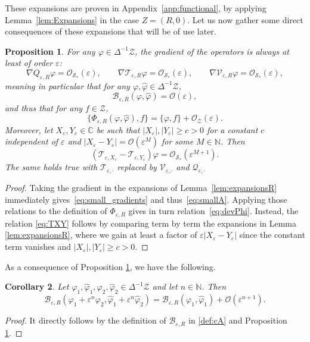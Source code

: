 \documentclass[11pt,reqno,a4paper]{amsart}
\def\eps{\varepsilon}
\def\NN {\mathbb{N}}
\newcommand{\cB}{\mathcal{B}}
\newcommand{\cO}{\mathcal{O}}
\newcommand{\cQ}{\mathcal{Q}}
\newcommand{\cS}{\mathcal{S}}
\newcommand{\cT}{\mathcal{T}}
\newcommand{\cV}{\mathcal{V}}
\newcommand{\cZ}{\mathcal{Z}}
\newcommand{\1}{\mathbbm{1}}
\newtheorem{proposition}{Proposition}[section]
\newtheorem{corollary}[proposition]{Corollary}
\theoremstyle{definition}
\theoremstyle{definition}
\numberwithin{equation}{section}
\begin{document}
These expansions are proven in Appendix~\ref{app:functional}, by applying Lemma~\ref{lem:Expansions} in the case $Z=(R,0)$.
Let us now gather some direct consequences of these expansions that will be of use later.
\begin{proposition}\label{prop:small_operator}
    For any $\varphi \in \Delta^{-1}\cZ$, the gradient of the operators is always at least of order $\eps$:
        \begin{equation}\label{eq:small_gradients}
            \nabla Q_{\eps,R} \varphi = \cO_{\cS_*}(\eps), \qquad \nabla \cT_{\eps,R} \varphi = \cO_{\cS_*}(\eps), \qquad \nabla \cV_{\eps,R} \varphi = \cO_{\cS_*}(\eps),
        \end{equation}
    meaning in particular that for any $\varphi,\widehat{\varphi} \in \Delta^{-1}\cZ$,
        \begin{equation}\label{eq:smallA}
            \cB_{\eps,R}(\varphi,\widehat{\varphi}) = \cO(\eps),
        \end{equation}
    and thus that for any $f \in \cZ$,
    \begin{equation}\label{eq:devPhi}
        \big\{\Phi_{\eps,R}(\varphi,\widehat{\varphi}),f \big\} = \{ \varphi, f\} + \cO_\cZ(\eps).
    \end{equation}
    Moreover, let $X_\eps,Y_\eps \in \mathbb{C}$ be such that $|X_\eps|,|Y_\eps|\geq c>0$ for a constant $c$ independent of $\eps$ and $|X_\eps - Y_\eps| = \cO(\eps^M)$ for some $M \in \NN$. Then
        \begin{equation}
        \label{eq:TXY}
            (\cT_{\eps,X_\eps}-\cT_{\eps,Y_\eps})\varphi = \cO_{\cS_*}(\eps^{M+1}).
        \end{equation}
        The same holds true with $\cT_{\eps,\cdot}$ replaced by $\cV_{\eps,\cdot}$ and $\cQ_{\eps,\cdot}$
\end{proposition}
\begin{proof}
    Taking the gradient in the expansions of Lemma~\ref{lem:expansionsR} immediately gives~\cref{eq:small_gradients} and thus~\cref{eq:smallA}. Applying those relations to the definition of $\Phi_{\eps,R}$ gives in turn relation~\cref{eq:devPhi}. Instead, the relation \cref{eq:TXY} follows by comparing term by term the expansions in Lemma \ref{lem:expansionsR}, where we gain at least a factor of $\eps|X_{\eps}-Y_{\eps}|$ since the constant term vanishes and $|X_{\eps}|,|Y_{\eps}|\geq c>0$.
\end{proof}
As a consequence of Proposition \ref{prop:small_operator}, we have the following.
\begin{corollary}\label{lem:expA}
    Let $\varphi_1,\widehat{\varphi}_1,\varphi_2,\widehat{\varphi}_2\in \Delta^{-1}\cZ$ and let $n \in \NN$. Then
    \begin{equation}
        \cB_{\eps,R}(\varphi_1 + \eps^n \varphi_2 , \widehat{\varphi}_1 + \eps^n \widehat{\varphi}_2) = \cB_{\eps,R}(\varphi_1,\widehat{\varphi}_1) + \cO(\eps^{n+1}).
    \end{equation}
\end{corollary}
\begin{proof}
    It directly follows by the definition of $\cB_{\eps,R}$ in \cref{def:cA} and Proposition \ref{prop:small_operator}.
\end{proof}
\end{document}
